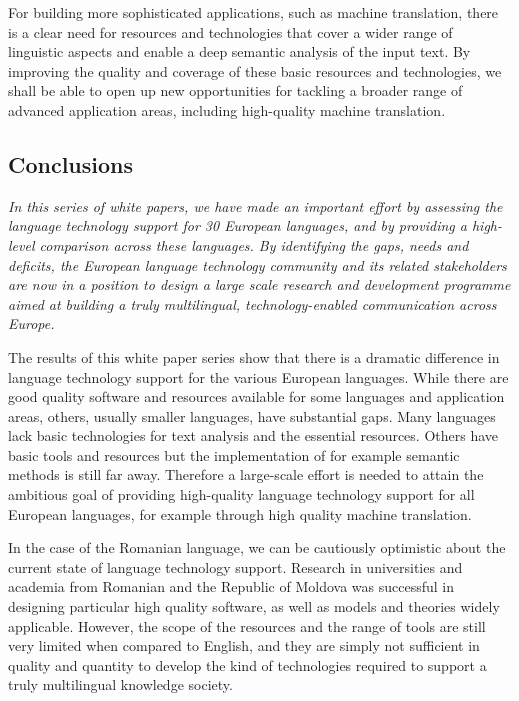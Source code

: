 \documentclass[]{../../metanetpaper}
\begin{document}
\begin{multicols}{2}
For building more sophisticated applications, such as machine translation, there is a clear need for resources and technologies that cover a wider range of linguistic aspects and enable a deep semantic analysis of the input text. By improving the quality and coverage of these basic resources and technologies, we shall be able to open up new opportunities for tackling a broader range of advanced application areas, including high-quality machine translation.

\subsection{Conclusions}

\emph{In this series of white papers, we have made an important effort by assessing the language technology support for 30 European languages, and by providing a high-level comparison across these languages. By identifying the gaps, needs and deficits, the European language technology community and its related stakeholders are now in a position to design a large scale research and development programme aimed at building a truly multilingual, technology-enabled communication across Europe.}

The results of this white paper series show that there is a dramatic difference in language technology support for the various European languages. While there are good quality software and resources available for some languages and application areas, others, usually smaller languages, have substantial gaps. Many languages lack basic technologies for text analysis and the essential resources. Others have basic tools and resources but the implementation of for example semantic methods is still far away. Therefore a large-scale effort is needed to attain the ambitious goal of providing high-quality language technology support for all European languages, for example through high quality machine translation. 

In the case of the Romanian language, we can be cautiously optimistic about the current state of language technology support. Research in universities and academia from Romanian and the Republic of Moldova was successful in designing particular high quality software, as well as models and theories widely applicable. However, the scope of the resources and the range of tools are still very limited when compared to English, and they are simply not sufficient in quality and quantity to develop the kind of technologies required to support a truly multilingual knowledge society.


\end{multicols}
\end{document}
